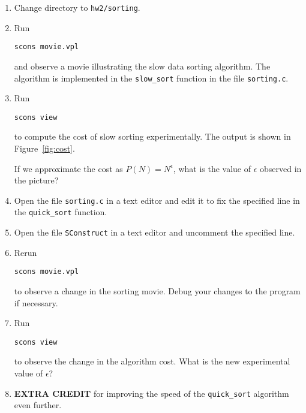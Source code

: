 \begin{enumerate}          
\item Change directory to \texttt{hw2/sorting}.
\item Run
\begin{verbatim}
scons movie.vpl
\end{verbatim}
and observe a movie illustrating the slow data sorting algorithm. The
algorithm is implemented in the \texttt{slow\_sort} function in the
file \texttt{sorting.c}.

\item Run
\begin{verbatim}
scons view
\end{verbatim}
to compute the cost of slow sorting experimentally. The output is
shown in Figure~\ref{fig:cost}.


If we approximate the cost as $P(N)=N^\epsilon$, what is the value of
$\epsilon$ observed in the picture?

\item Open the file \texttt{sorting.c} in a text editor and edit it to 
fix the specified line in the \texttt{quick\_sort} function.

\item Open the file \texttt{SConstruct} in a text editor and uncomment 
      the specified line.

\item Rerun
\begin{verbatim}
scons movie.vpl
\end{verbatim}
to observe a change in the sorting movie. Debug your changes to the
program if necessary.

\item Run
\begin{verbatim}
scons view
\end{verbatim}
to observe the change in the algorithm cost. What is the new
experimental value of $\epsilon$?

\item \textbf{EXTRA CREDIT} for improving the speed of the 
\texttt{quick\_sort} algorithm even further.
\end{enumerate}

\lstset{language=c,numbers=left,numberstyle=\tiny,showstringspaces=false}


